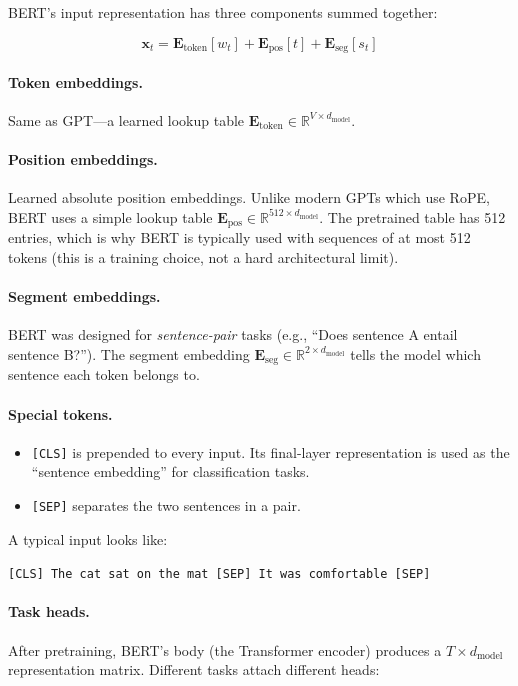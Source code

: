 BERT's input representation has three components summed together:

\[
  \mathbf{x}_t = \mathbf{E}_{\text{token}}[w_t] + \mathbf{E}_{\text{pos}}[t] + \mathbf{E}_{\text{seg}}[s_t]
\]

\paragraph{Token embeddings.} Same as GPT---a learned lookup table $\mathbf{E}_{\text{token}} \in \mathbb{R}^{V \times d_\text{model}}$.

\paragraph{Position embeddings.} Learned absolute position embeddings. Unlike modern GPTs which use RoPE, BERT uses a simple lookup table $\mathbf{E}_{\text{pos}} \in \mathbb{R}^{512 \times d_\text{model}}$. The pretrained table has 512 entries, which is why BERT is typically used with sequences of at most 512 tokens (this is a training choice, not a hard architectural limit).

\paragraph{Segment embeddings.} BERT was designed for \emph{sentence-pair} tasks (e.g., ``Does sentence A entail sentence B?''). The segment embedding $\mathbf{E}_{\text{seg}} \in \mathbb{R}^{2 \times d_\text{model}}$ tells the model which sentence each token belongs to.

\paragraph{Special tokens.}
\begin{itemize}[nosep]
  \item \texttt{[CLS]} is prepended to every input. Its final-layer representation is used as the ``sentence embedding'' for classification tasks.
  \item \texttt{[SEP]} separates the two sentences in a pair.
\end{itemize}

A typical input looks like:

\begin{center}
\texttt{[CLS] The cat sat on the mat [SEP] It was comfortable [SEP]}
\end{center}

\paragraph{Task heads.} After pretraining, BERT's body (the Transformer encoder) produces a $T \times d_\text{model}$ representation matrix. Different tasks attach different heads:

